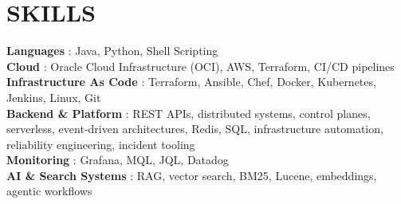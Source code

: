\documentclass[letterpaper,11pt]{article}
\begin{document}
\section{SKILLS}
\begin{itemize}[leftmargin=0in, label={}]
    \small{\item{
     \textbf{Languages} {: Java, Python, Shell Scripting} \\
     \textbf{Cloud} {: Oracle Cloud Infrastructure (OCI), AWS, Terraform, CI/CD pipelines} \\
     \textbf{Infrastructure As Code} {: Terraform, Ansible, Chef, Docker, Kubernetes, Jenkins, Linux, Git} \\
     \textbf{Backend \& Platform} {: REST APIs, distributed systems, control planes, serverless, event-driven architectures, Redis, SQL, infrastructure automation, reliability engineering, incident tooling} \\
     \textbf{Monitoring} {: Grafana, MQL, JQL, Datadog} \\
     \textbf{AI \& Search Systems} {: RAG, vector search, BM25, Lucene, embeddings, agentic workflows}
    }}
\end{itemize}

\end{document}
